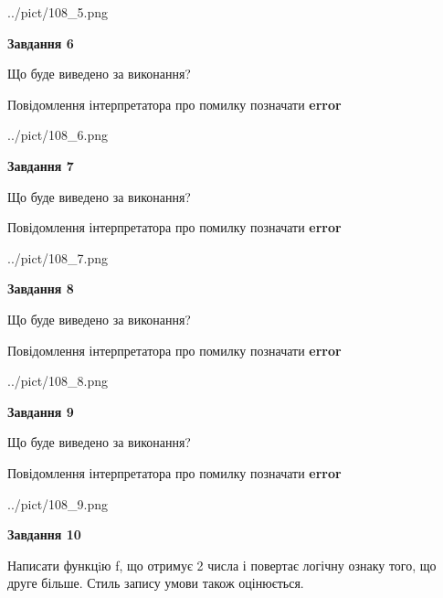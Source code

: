 \documentclass[12pt, ukrainian]{article}
\begin{document}
{\begin {large}
\begin{center}
	{../pict/108_5.png}
\end{center}
\newpage

{\begin {center}\textbf{Завдання 6}\end {center}}\par
Що буде виведено за виконання? \par
Повідомлення інтерпретатора про помилку позначати \textbf{error}

\begin{center}
	{../pict/108_6.png}
\end{center}
\newpage

{\begin {center}\textbf{Завдання 7}\end {center}}\par
Що буде виведено за виконання? \par
Повідомлення інтерпретатора про помилку позначати \textbf{error}

\begin{center}
	{../pict/108_7.png}
\end{center}
\newpage

{\begin {center}\textbf{Завдання 8}\end {center}}\par
Що буде виведено за виконання? \par
Повідомлення інтерпретатора про помилку позначати \textbf{error}

\begin{center}
	{../pict/108_8.png}
\end{center}
\newpage

{\begin {center}\textbf{Завдання 9}\end {center}}\par
Що буде виведено за виконання? \par
Повідомлення інтерпретатора про помилку позначати \textbf{error}

\begin{center}
	{../pict/108_9.png}
\end{center}
\newpage

{\begin {center}\textbf{Завдання 10}\end {center}}\par

Написати функцiю f, що отримує 2 числа і повертає логічну ознаку того, що друге більше. Стиль запису умови також оцінюється.\par
\newpage

\end {large}}
\end{document}
